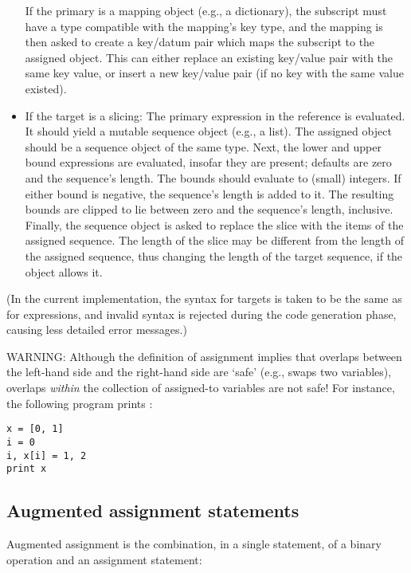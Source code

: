 \begin{itemize}
If the primary is a mapping object (e.g., a dictionary), the subscript must
have a type compatible with the mapping's key type, and the mapping is
then asked to create a key/datum pair which maps the subscript to
the assigned object.  This can either replace an existing key/value
pair with the same key value, or insert a new key/value pair (if no
key with the same value existed).

\item
If the target is a slicing: The primary expression in the reference is
evaluated.  It should yield a mutable sequence object (e.g., a list).  The
assigned object should be a sequence object of the same type.  Next,
the lower and upper bound expressions are evaluated, insofar they are
present; defaults are zero and the sequence's length.  The bounds
should evaluate to (small) integers.  If either bound is negative, the
sequence's length is added to it.  The resulting bounds are clipped to
lie between zero and the sequence's length, inclusive.  Finally, the
sequence object is asked to replace the slice with the items of the
assigned sequence.  The length of the slice may be different from the
length of the assigned sequence, thus changing the length of the
target sequence, if the object allows it.

\end{itemize}
        
(In the current implementation, the syntax for targets is taken
to be the same as for expressions, and invalid syntax is rejected
during the code generation phase, causing less detailed error
messages.)

WARNING: Although the definition of assignment implies that overlaps
between the left-hand side and the right-hand side are `safe' (e.g.,
 swaps two variables), overlaps \emph{within} the
collection of assigned-to variables are not safe!  For instance, the
following program prints \samp{[0, 2]}:

\begin{verbatim}
x = [0, 1]
i = 0
i, x[i] = 1, 2
print x
\end{verbatim}


\subsection{Augmented assignment statements \label{augassign}}

Augmented assignment is the combination, in a single statement, of a binary
operation and an assignment statement:


